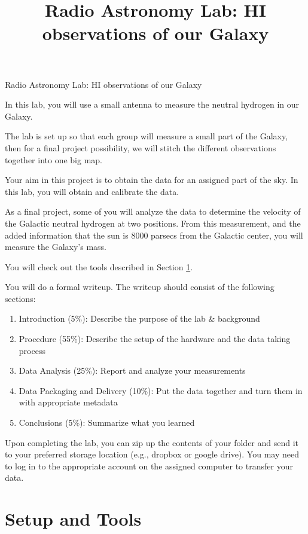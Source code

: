 \documentclass[11pt]{article}
\begin{document}
\title{Radio Astronomy Lab: HI observations of our Galaxy}
\begin{center}
    {\LARGE  \centering Radio Astronomy Lab: HI observations of our Galaxy}
\end{center}


In this lab, you will use a small antenna to measure the neutral hydrogen in
our Galaxy.

The lab is set up so that each group will measure a small part of the Galaxy,
then for a final project possibility, we will stitch the different observations
together into one big map.

Your aim in this project is to obtain the data for an assigned part of the sky.
In this lab, you will obtain and calibrate the data.

As a final project, some of you will analyze the data to determine the velocity
of the Galactic neutral hydrogen at two positions.  From this measurement, and
the added information that the sun is 8000 parsecs from the Galactic center,
you will measure the Galaxy's mass.

You will check out the tools described in Section \ref{sec:tools}.

You will do a formal writeup.  The writeup should consist of the following sections:
\begin{enumerate}
    \item Introduction (5\%): Describe the purpose of the lab \& background
    \item Procedure (55\%): Describe the setup of the hardware and the data taking process
    \item Data Analysis (25\%):  Report and analyze your measurements
    \item Data Packaging and Delivery (10\%): Put the data together and turn them in with appropriate metadata
    \item Conclusions (5\%): Summarize what you learned
\end{enumerate}

Upon completing the lab, you can zip up the contents of your folder and send it
to your preferred storage location (e.g., dropbox or google drive).
You may need to log in to the appropriate account on the assigned computer to transfer your data.

\section{Setup and Tools}
\label{sec:tools}
\end{document}
